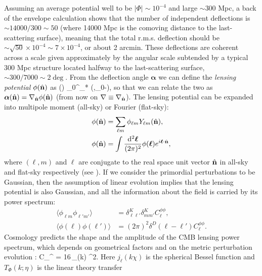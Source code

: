  Assuming an average potential well to be $|\Phi | \sim 10^{-4}$ and large 
$\sim 300$ Mpc, a back of the envelope calculation shows that the number of independent deflections 
is $\sim 14000/300 \sim 50$ (where 14000 Mpc is the comoving distance to the last-scattering surface),
meaning that the total r.m.s. deflection should be $\sim \sqrt{50}\times 10^{-4} \sim 7\times 10^{-4}$, or 
about 2 arcmin. These deflections are coherent across a scale given approximately by the angular scale
subtended by a typical 300 Mpc structure located halfway to the last-scattering surface, $\sim 300/7000 \sim 2 \deg$.
From the deflection angle $\bm{\alpha}$ we can define the \emph{lensing potential} $\phi(\hat{\mathbf{n}})$ as
%
\be
\label{eq:cmblens_phi}
\phi(\nver) \int_0^{\chi_*} \diff\chi{}\Phi(\chi\nver,\eta_0-\chi),
\ee
%
so that we can relate the two as $\bm{\alpha}(\hat{\mathbf{n}}) = \nabla_{\hat{\mathbf{n}}}\phi(\hat{\mathbf{n}})$ (from now on $\nabla\equiv \nabla_{\hat{\mathbf{n}}}$). The lensing potential can be expanded into multipole moment (all-sky) or Fourier (flat-sky):
%
\begin{align}
\phi(\hat{\mathbf{n}}) &= \sum_{\ell m}\phi_{\ell m}Y_{\ell m}(\hat{\mathbf{n}}),\\
\phi(\hat{\mathbf{n}}) &= \int\frac{\mathop{}\!\mathrm{d}^2\bm{\ell}}{(2\pi)^2}\phi(\bm{\ell}) e^{i\bm{\ell}\cdot\hat{\mathbf{n}}},
\end{align}
%
where $(\ell,m)$ and $\bm{\ell}$ are conjugate to the real space unit vector $\hat{\mathbf{n}}$ in all-sky and flat-sky respectively (see \cite{Hu2000}). 
If we consider the primordial perturbations to be Gaussian, then the assumption of linear
evolution implies that the lensing potential is also Gaussian, and all the information about the field is 
carried by its power spectrum:
%
\begin{align}
\langle\phi_{\ell m}\phi_{\ell' m'}\rangle &= \delta^K_{\ell\ell'}\delta^K_{mm'}C_{\ell}^{\phi\phi},\\
\langle\phi(\bm{\ell})\phi(\bm{\ell'})\rangle &= (2\pi)^2\delta^D(\bm{\ell -\ell'})C_{\ell}^{\phi\phi}.
\end{align}
%
Cosmology predicts the shape and the amplitude of the \gls{CMB} lensing power spectrum, which depends
on geometrical factors and on the metric perturbation evolution \citep{Lewis2006}:
%
\be
\label{eq:cmblens_clphi}
C_{\ell}^{\phi\phi} = 16\pi\int\diff{}\,_{}(k) ^2.
\ee
%
Here $j_{\ell}(k\chi)$ is the spherical Bessel function and $T_{\Phi}(k;\eta)$ is the linear theory transfer
